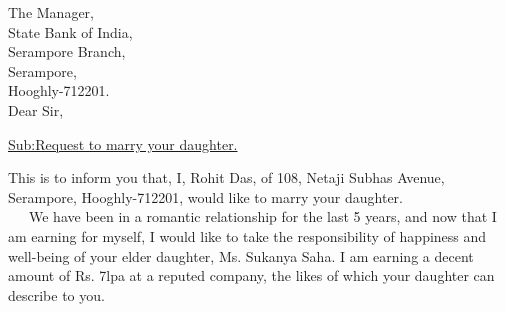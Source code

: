 \documentclass[11pt]{article}
\begin{document}
\begin{Large}

\begin{flushleft}
The Manager,\\
State Bank of India,\\
Serampore Branch,\\
Serampore,\\
Hooghly-712201.\\
\bigbreak
Dear Sir,\\
\end{flushleft}
\begin{center}
\underline{Sub:Request to marry your daughter.}
\end{center}

This is to inform you that, I, Rohit Das, of 108, Netaji Subhas Avenue, Serampore, Hooghly-712201, would like to marry your daughter.\\
\newline
\ \ \ We have been in a romantic relationship for the last 5 years, and now that I am earning for myself, I would like to take the responsibility of happiness and well-being of your elder daughter, Ms. Sukanya Saha. I am earning a decent amount of Rs. 7lpa at a reputed company, the likes of which your daughter can describe to you.
\ \ \

\end{Large} 
\end{document}
